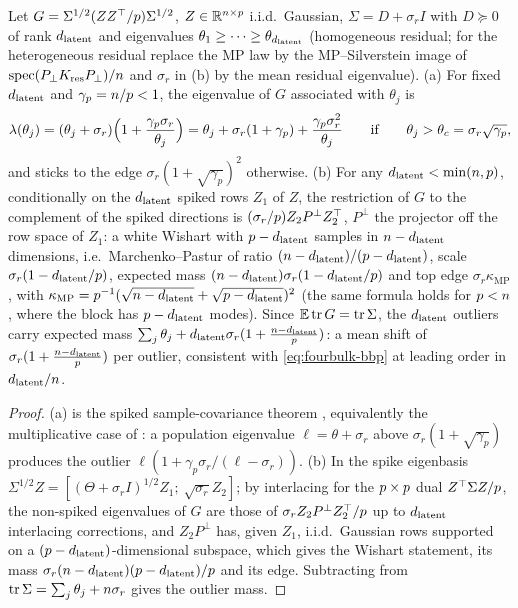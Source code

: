 \begin{lemma}\label{lem:fourbulk-bbp}
Let $G=\Sigma^{1/2}(ZZ^\top/p)\Sigma^{1/2}$, $Z\in\mathbb{R}^{n\times p}$ i.i.d.\ Gaussian, $\Sigma=D+\sigma_rI$ with $D\succeq0$ of rank $d_{\mathrm{latent}}$ and eigenvalues $\theta_1\ge\dots\ge\theta_{d_{\mathrm{latent}}}$ (homogeneous residual; for the heterogeneous residual replace the MP law by the MP--Silverstein image of $\operatorname{spec}(P_\perp K_{\mathrm{res}}P_\perp)/n$ and $\sigma_r$ in (b) by the mean residual eigenvalue). (a) For fixed $d_{\mathrm{latent}}$ and $\gamma_p=n/p<1$, the eigenvalue of $G$ associated with $\theta_j$ is
\begin{equation}\label{eq:fourbulk-bbp}
  \lambda(\theta_j)=(\theta_j+\sigma_r)\Bigl(1+\frac{\gamma_p\sigma_r}{\theta_j}\Bigr)=\theta_j+\sigma_r(1+\gamma_p)+\frac{\gamma_p\sigma_r^2}{\theta_j}
  \qquad\text{if}\qquad\theta_j>\theta_c=\sigma_r\sqrt{\gamma_p},
\end{equation}
and sticks to the edge $\sigma_r(1+\sqrt{\gamma_p})^2$ otherwise. (b) For any $d_{\mathrm{latent}}<\min(n,p)$, conditionally on the $d_{\mathrm{latent}}$ spiked rows $Z_1$ of $Z$, the restriction of $G$ to the complement of the spiked directions is $(\sigma_r/p)Z_2P^\perp Z_2^\top$, $P^\perp$ the projector off the row space of $Z_1$: a white Wishart with $p-d_{\mathrm{latent}}$ samples in $n-d_{\mathrm{latent}}$ dimensions, i.e.\ Marchenko--Pastur of ratio $(n-d_{\mathrm{latent}})/(p-d_{\mathrm{latent}})$, scale $\sigma_r(1-d_{\mathrm{latent}}/p)$, expected mass $(n-d_{\mathrm{latent}})\sigma_r(1-d_{\mathrm{latent}}/p)$ and top edge $\sigma_r\kappa_{\mathrm{MP}}$, with $\kappa_{\mathrm{MP}}=p^{-1}(\sqrt{n-d_{\mathrm{latent}}}+\sqrt{p-d_{\mathrm{latent}}})^2$ (the same formula holds for $p<n$, where the block has $p-d_{\mathrm{latent}}$ modes). Since $\mathbb{E}\operatorname{tr}G=\operatorname{tr}\Sigma$, the $d_{\mathrm{latent}}$ outliers carry expected mass $\sum_j\theta_j+d_{\mathrm{latent}}\sigma_r(1+\tfrac{n-d_{\mathrm{latent}}}{p})$: a mean shift of $\sigma_r(1+\tfrac{n-d_{\mathrm{latent}}}{p})$ per outlier, consistent with \eqref{eq:fourbulk-bbp} at leading order in $d_{\mathrm{latent}}/n$.
\end{lemma}
\begin{proof}
(a) is the spiked sample-covariance theorem \citep{baik2005phase,baik2006eigenvalues}, equivalently the multiplicative case of \citet{benaychgeorges2011eigenvalues}: a population eigenvalue $\ell=\theta+\sigma_r$ above $\sigma_r(1+\sqrt{\gamma_p})$ produces the outlier $\ell(1+\gamma_p\sigma_r/(\ell-\sigma_r))$. (b) In the spike eigenbasis $\Sigma^{1/2}Z=[(\Theta+\sigma_rI)^{1/2}Z_1;\ \sqrt{\sigma_r}Z_2]$; by interlacing for the $p\times p$ dual $Z^\top\Sigma Z/p$, the non-spiked eigenvalues of $G$ are those of $\sigma_rZ_2P^\perp Z_2^\top/p$ up to $d_{\mathrm{latent}}$ interlacing corrections, and $Z_2P^\perp$ has, given $Z_1$, i.i.d.\ Gaussian rows supported on a $(p-d_{\mathrm{latent}})$-dimensional subspace, which gives the Wishart statement, its mass $\sigma_r(n-d_{\mathrm{latent}})(p-d_{\mathrm{latent}})/p$ and its edge. Subtracting from $\operatorname{tr}\Sigma=\sum_j\theta_j+n\sigma_r$ gives the outlier mass.
\end{proof}
